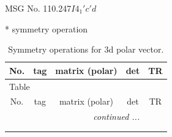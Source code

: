 \documentclass[fleqn,8pt]{jsarticle}
\begin{document}
\setcounter{MaxMatrixCols}{32}

\renewcommand{\tablename}{Table~}
\renewcommand{\figurename}{Figure~}
\begin{center}
\LARGE
MSG No. 110.247\quad$I4_{1}'c'd$
\end{center}
* symmetry operation
\renewcommand{\arraystretch}{1.3}
\begin{longtable}{ccccc}
\caption{Symmetry operations for 3d polar vector.}
 \\
 \hline \hline
No. & tag & matrix (polar) & det & TR \\ \hline \endfirsthead

\multicolumn{4}{l}{\tablename\ \thetable{}} \\
 \hline \hline
No. & tag & matrix (polar) & det & TR \\ \hline \endhead

 \hline \hline
\multicolumn{4}{r}{\footnotesize\it continued ...} \\ \endfoot

 \hline \hline
\multicolumn{4}{r}{} \\ \endlastfoot


\end{longtable}
\end{document}

